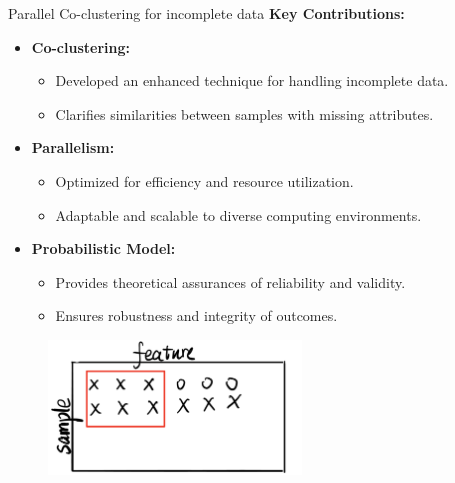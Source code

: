 \documentclass{beamer}
\begin{document}
\begin{frame}{Parallel Co-clustering for incomplete data}
    \textbf{Key Contributions:}
    \begin{itemize}
        \item \textbf{Co-clustering:} 
        \begin{itemize}
            \item Developed an enhanced technique for handling incomplete data.
            \item Clarifies similarities between samples with missing attributes.
        \end{itemize}
        
        \item \textbf{Parallelism:} 
        \begin{itemize}
            \item Optimized for efficiency and resource utilization.
            \item Adaptable and scalable to diverse computing environments.
        \end{itemize}
        
        \item \textbf{Probabilistic Model:} 
        \begin{itemize}
            \item Provides theoretical assurances of reliability and validity.
            \item Ensures robustness and integrity of outcomes.
        \end{itemize}
    \end{itemize}
    \begin{figure}
        \centering
        \includegraphics[width=0.6\textwidth]{idea.jpeg}
    \end{figure}
\end{frame}
\end{document}
